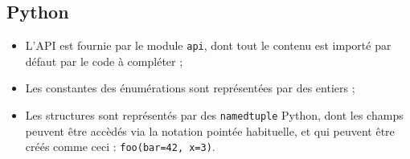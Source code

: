 \subsection{Python}

\begin{itemize}
\item{L'API est fournie par le module \texttt{api}, dont tout le contenu est
      importé par défaut par le code à compléter ;}
\item{Les constantes des énumérations sont représentées par des entiers ;}
\item{Les structures sont représentés par des \texttt{namedtuple} Python, dont
      les champs peuvent être accèdés via la notation pointée habituelle, et
      qui peuvent être créés comme ceci : \texttt{foo(bar=42, x=3)}.}
\end{itemize}
